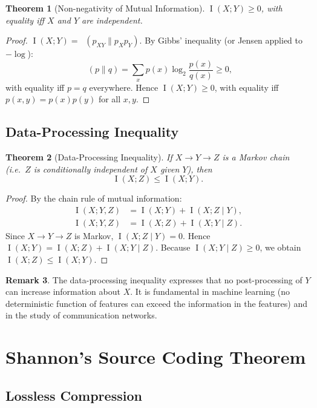 \documentclass[12pt,a4paper]{amsart}
\newtheorem{theorem}{Theorem}[section]
\theoremstyle{definition}
\newtheorem{remark}[theorem]{Remark}
\theoremstyle{remark}
\DeclareMathOperator{\MI}{I}
\DeclareMathOperator{\KL}{D_{KL}}
\begin{document}
\begin{theorem}[Non-negativity of Mutual Information]\label{thm:mi-nonneg}
$\MI(X;Y) \geq 0$, with equality iff $X$ and $Y$ are independent.
\end{theorem}
\begin{proof}
$\MI(X;Y) = \KL(p_{XY}\|p_Xp_Y)$. By Gibbs' inequality (or Jensen applied to
$-\log$):
\[
  \KL(p \| q) = \sum_x p(x)\log_2\frac{p(x)}{q(x)} \geq 0,
\]
with equality iff $p = q$ everywhere. Hence $\MI(X;Y) \geq 0$, with equality iff
$p(x,y) = p(x)p(y)$ for all $x,y$.
\end{proof}

\subsection{Data-Processing Inequality}

\begin{theorem}[Data-Processing Inequality]\label{thm:dpi}
If $X \to Y \to Z$ is a Markov chain (i.e.\ $Z$ is conditionally independent of
$X$ given $Y$), then
\[
  \MI(X;Z) \leq \MI(X;Y).
\]
\end{theorem}
\begin{proof}
By the chain rule of mutual information:
\begin{align*}
  \MI(X;Y,Z) &= \MI(X;Y) + \MI(X;Z\mid Y), \\
  \MI(X;Y,Z) &= \MI(X;Z) + \MI(X;Y\mid Z).
\end{align*}
Since $X \to Y \to Z$ is Markov, $\MI(X;Z \mid Y) = 0$. Hence
$\MI(X;Y) = \MI(X;Z) + \MI(X;Y \mid Z)$.
Because $\MI(X;Y\mid Z) \geq 0$, we obtain $\MI(X;Z) \leq \MI(X;Y)$.
\end{proof}

\begin{remark}
The data-processing inequality expresses that no post-processing of $Y$ can
increase information about $X$. It is fundamental in machine learning (no
deterministic function of features can exceed the information in the features)
and in the study of communication networks.
\end{remark}

\section{Shannon's Source Coding Theorem}

\subsection{Lossless Compression}
\end{document}
